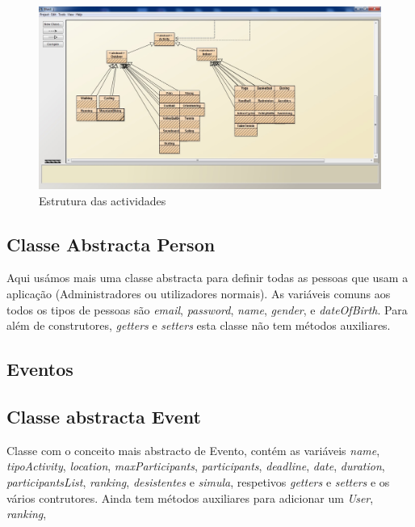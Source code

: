 \documentclass[10pt,notitlepage]{article}
\begin{document}
\subsection{}

\begin{figure}[ht]
\centering
\includegraphics[scale=0.5]{Activity.jpg}
\caption{Estrutura das actividades}
\label{fig:actividades}
\end{figure}


\subsection{Classe Abstracta Person}

Aqui usámos mais uma classe abstracta para definir todas as pessoas que usam a aplicação (Administradores ou utilizadores normais). As variáveis comuns aos todos os tipos de pessoas são \textit{email}, \textit{password}, \textit{name}, \textit{gender}, e \textit{dateOfBirth}. Para além de 
construtores, \textit{getters} e \textit{setters} esta classe não tem métodos auxiliares.




\subsection{Eventos}

\subsection{Classe abstracta Event}

Classe com o conceito mais abstracto de Evento, contém as variáveis \textit{name}, \textit{tipoActivity}, \textit{location}, \textit{maxParticipants}, \textit{participants}, \textit{deadline}, \textit{date}, \textit{duration}, \textit{participantsList}, \textit{ranking}, \textit{desistentes} e \textit{simula}, respetivos \textit{getters} e \textit{setters} e os vários contrutores. Ainda tem métodos auxiliares para adicionar um \textit{User}, \textit{ranking}, 


\subsection{}
\end{document}
